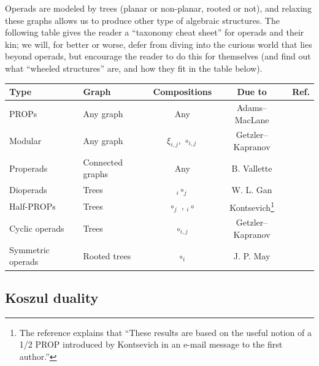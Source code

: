 \documentclass[fleqn, a4paper, twoside]{article}
\newcommand{\0}{\langle 0\rangle}
\DeclareRobustCommand{\[}{\begin{equation}}%
\DeclareRobustCommand{\]}{\end{equation}}%
\theoremstyle{mytheorem}
\theoremstyle{introthm}
\theoremstyle{mydefinition}
\theoremstyle{mydefinition2}
\theoremstyle{plain} %
\newcommand{\?}{\,?\,}
\theoremstyle{mytheorem}
\theoremstyle{plain} %
\begin{document}
Operads are modeled by trees (planar or
non-planar, rooted or not), and relaxing these
graphs allows us to produce other type of 
algebraic structures. The following table
gives the reader a ``taxonomy cheat sheet''
for operads and their kin; we will, for better
or worse, defer from diving into the curious
world that lies beyond operads, but encourage
the reader to do this for themselves (and find
out what ``wheeled structures'' are, and how
they fit in the table below).

\begin{center}
\begin{tabular}{@{}llccr@{}} \toprule
Type & Graph & Compositions & Due to & Ref.\\ \midrule
PROPs & Any graph & Any  & Adams--MacLane \\
Modular & Any graph & $\xi_{i,j}$, $\circ_{i,j}$  & Getzler--Kapranov & \cite{Getzler1998}\\ 
Properads & Connected graphs & Any & B. Vallette & \cite{Vallette2004}\\
Dioperads & Trees & ${}_i\circ_j$ & W. L. Gan & \cite{Gan2003}\\
Half-PROPs & Trees & $\circ_j$ , ${}_i\circ$ & 
 Kontsevich\footnote{The reference explains that ``These results are based on the useful notion of a 1/2 PROP introduced by Kontsevich in an e-mail message to the first author.''} & \cite{Markl2007}\\ 
Cyclic operads & Trees &  $\circ_{i,j}$ & Getzler--Kapranov & \cite{Kajiura2008}\\ 
Symmetric operads & Rooted trees & $\circ_i$  & J. P. May & \cite{May1972}\\ 
\bottomrule
\end{tabular}
\end{center}

\subsection{Koszul duality}
 
\end{document}

